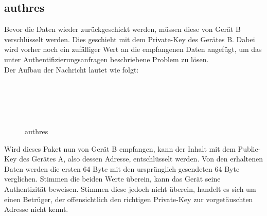 \subsection{\gls{authres}}
Bevor die Daten wieder zurückgeschickt werden, müssen diese von Gerät B verschlüsselt werden. Dies geschieht mit dem Private-Key des Gerätes B. Dabei wird vorher noch ein zufälliger Wert an die empfangenen Daten angefügt, um das unter Authentifizierungsanfragen beschriebene Problem zu lösen.\\
Der Aufbau der Nachricht lautet wie folgt:
\begin{figure}[H]
\begin{centering}

\begin{bytefield}[bitwidth=3em]{8}
	\\
	 \\
	
	\begin{rightwordgroup}{\isprotomsgtype}
	\end{rightwordgroup} \\
	
	\begin{rightwordgroup}{\isprotomsgdata}
	\end{rightwordgroup}
	
\end{bytefield}

\par\end{centering}
\protect\caption{\gls{authres}}
\end{figure}
Wird dieses Paket nun von Gerät B empfangen, kann der Inhalt mit dem Public-Key des Gerätes A, also dessen Adresse, entschlüsselt werden. Von den erhaltenen Daten werden die ersten 64 Byte mit den ursprünglich gesendeten 64 Byte verglichen. Stimmen die beiden Werte überein, kann das Gerät seine Authentizität beweisen. Stimmen diese jedoch nicht überein, handelt es sich um einen Betrüger, der offensichtlich den richtigen Private-Key zur vorgetäuschten Adresse nicht kennt.
		
